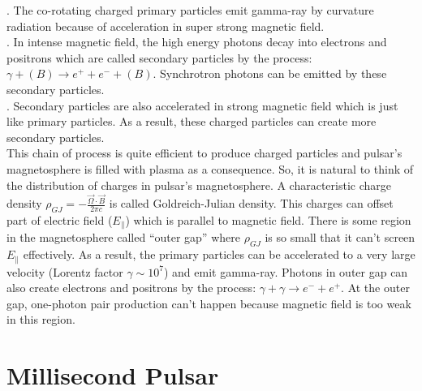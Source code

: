 \documentclass[12pt]{report}
\begin{document}
          . The co-rotating charged primary particles emit gamma-ray by curvature radiation 
          because of acceleration in super strong magnetic field.  \\
          . In intense magnetic field,  the high energy photons decay into electrons and 
          positrons which are called secondary particles by the process: 
          $\gamma + (B) \rightarrow e^++e^-+(B)$. Synchrotron 
          photons can be emitted by these secondary particles. \\
          . Secondary particles are also accelerated in strong magnetic field which is just like 
          primary particles. As a result, these charged particles can create more secondary particles. \\
          \indent This chain of process is quite efficient to produce charged particles and pulsar's 
          magnetosphere is filled with plasma as a consequence. So, it is natural to think of the 
          distribution of charges in pulsar's magnetosphere. A characteristic charge density 
          $\rho_{GJ}=-\frac{\vec{\Omega}\cdot \vec{B}}{2\pi c}$ is called Goldreich-Julian density. 
          This charges can offset part of electric field ($E_{\parallel}$) which is parallel to magnetic 
          field. There is some region in the magnetosphere called ``outer gap'' where $\rho_{GJ}$ is so 
          small that it can't screen $E_{\parallel}$ effectively. As a result, the primary particles can 
          be accelerated to a very large velocity (Lorentz factor $\gamma\sim 10^7$) and emit gamma-ray. 
          Photons in outer gap can also create electrons and positrons by the process: 
          $\gamma+\gamma\rightarrow e^-+e^+$. At the outer gap, one-photon pair production can't happen 
          because magnetic field is too weak in this region.

      \section{Millisecond Pulsar} 
\end{document}
